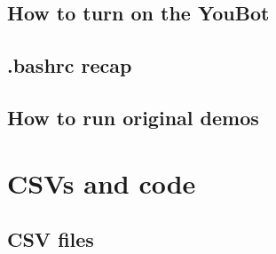 \documentclass[a4paper, 12pt]{article}
\begin{document}
    \subsection{
     How to turn on the YouBot
    }

    \subsection{.bashrc recap}

    \subsection{How to run original demos}

    \section{CSVs and code}

    \subsection{CSV files}
\end{document}
